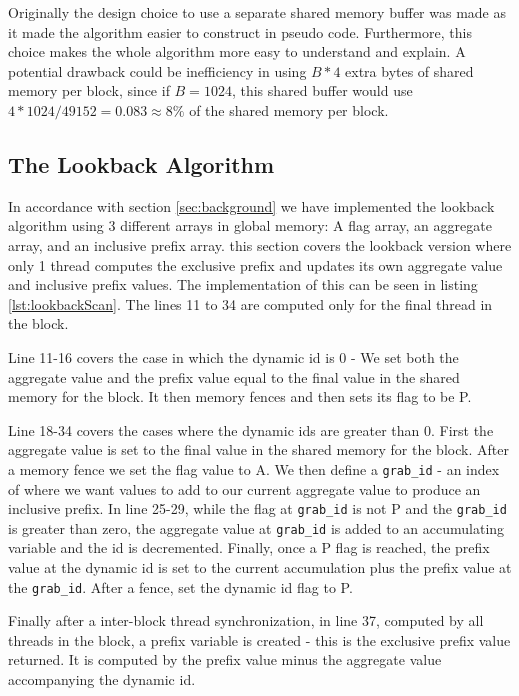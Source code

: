 \documentclass[twocolumn]{article}
\begin{document}
Originally the design choice to use a separate shared memory buffer was made as it made the algorithm easier to construct in pseudo code. Furthermore, this choice makes the whole algorithm more easy to understand and explain. A potential drawback could be inefficiency in using $B*4$ extra bytes of shared memory per block, since if $B=1024$, this shared buffer would use $4*1024/49152 = 0.083\approx 8\%$ of the shared memory per block.

\subsection{The Lookback Algorithm}
\label{sec:impl-lookback-alg}

In accordance with section \ref{sec:background} we have implemented the lookback algorithm using 3 different arrays in global memory: A flag array, an aggregate array, and an inclusive prefix array. this section covers the lookback version where only 1 thread computes the exclusive prefix and updates its own aggregate value and inclusive prefix values. The implementation of this can be seen in listing \ref{lst:lookbackScan}. The lines 11 to 34 are computed only for the final thread in the block.

Line 11-16 covers the case in which the dynamic id is 0 - We set both the aggregate value and the prefix value equal to the final value in the shared memory for the block. It then memory fences and then sets its flag to be P.

Line 18-34 covers the cases where the dynamic ids are greater than 0. First the aggregate value is set to the final value in the shared memory for the block. After a memory fence we set the flag value to A. We then define a \verb|grab_id| - an index of where we want values to add to our current aggregate value to produce an inclusive prefix. In line 25-29, while the flag at \verb|grab_id| is not P and the \verb|grab_id| is greater than zero, the aggregate value at \verb|grab_id| is added to an accumulating variable and the id is decremented. Finally, once a P flag is reached, the prefix value at the dynamic id is set to the current accumulation plus the prefix value at the \verb|grab_id|. After a fence, set the dynamic id flag to P.

Finally after a inter-block thread synchronization, in line 37, computed by all threads in the block, a prefix variable is created - this is the exclusive prefix value returned. It is computed by the prefix value minus the aggregate value accompanying the dynamic id.
\end{document}
